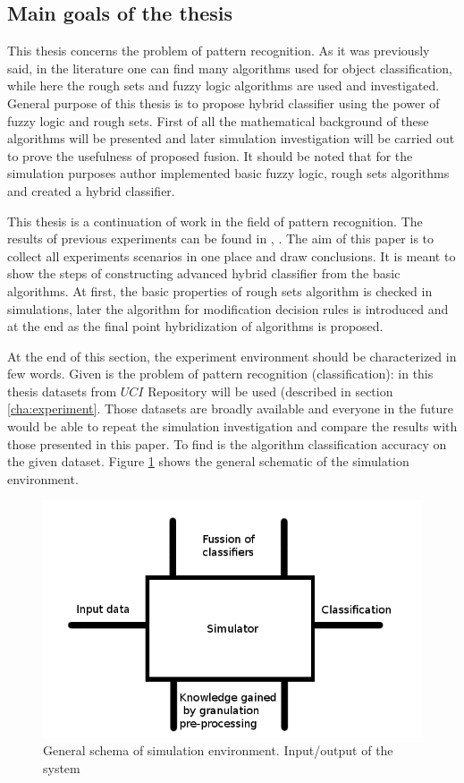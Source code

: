 \subsection{Main goals of the  thesis}
This thesis concerns the problem of pattern recognition. As it was previously
said, in the literature one can find many algorithms used for object
classification, while here the rough sets and fuzzy logic algorithms are used 
and investigated. General purpose of this thesis is to propose hybrid
classifier using the power of fuzzy logic and rough sets. First of all the
mathematical background of these algorithms will be presented and later
simulation investigation will be carried out to prove the usefulness of
proposed fusion. It should be noted that for the simulation purposes author
implemented basic fuzzy logic, rough sets algorithms and created a hybrid
classifier.

This thesis is a continuation of work in the field of pattern recognition.
The results of previous experiments can be found in \cite{bib1}, \cite{bib2}. 
The aim of this paper is to collect all experiments scenarios in one place and draw
conclusions. It is meant to show the steps of constructing advanced hybrid
classifier from the basic algorithms. At first, the basic properties of rough
sets algorithm is checked in simulations, later the algorithm for 
modification decision rules is introduced and at the end as the final point
hybridization of algorithms is proposed.

At the end of this section, the experiment environment should be characterized in
few words. Given is the problem of pattern recognition (classification): in
this thesis datasets from $UCI$ Repository will be used (described in section
\ref{cha:experiment}. Those datasets are broadly available and everyone in the
future would be able to repeat the simulation investigation and compare the
results with those presented in this paper. To find is the algorithm classification accuracy on the given dataset.
Figure \ref{fig:input_output} shows the general schematic of the simulation
environment.
\begin{figure}[H]
    \begin{center}
        \includegraphics[width=\textwidth, height=0.5\textwidth]{fig/schema.png}
    \end{center}
    \caption{General schema of simulation environment. Input/output of the
    system}
    \label{fig:input_output}
\end{figure}

